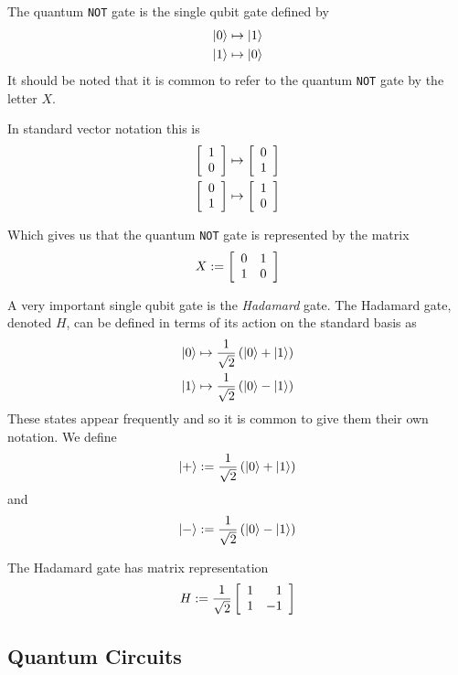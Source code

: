         \begin{example}
            The quantum \texttt{NOT} gate is the single qubit gate defined by
            \begin{align*}
                \ket{0} &\mapsto \ket{1} \\
                \ket{1} &\mapsto \ket{0}
            \end{align*}
            It should be noted that it is common to refer to the quantum \texttt{NOT} gate by the letter $X$.

            In standard vector notation this is
            \begin{align*}
                \left[\begin{array}{r}1\\0\end{array}\right] &\mapsto \left[\begin{array}{r}0\\1\end{array}\right] \\
                \left[\begin{array}{r}0\\1\end{array}\right] &\mapsto \left[\begin{array}{r}1\\0\end{array}\right] 
            \end{align*}

            Which gives us that the quantum \texttt{NOT} gate is represented by the matrix
            \[
                X := \left[\begin{array}{rr}0&1\\1&0\end{array}\right]
            \]
        \end{example}

        
        \begin{example}
            A very important single qubit gate is the \emph{Hadamard} gate. The Hadamard gate, denoted $H$, can be 
            defined in terms of its action on the standard basis as
            \begin{align*}
                \ket{0} &\mapsto \frac{1}{\sqrt{2}}\left(\ket{0} + \ket{1}\right) \\
                \ket{1} &\mapsto \frac{1}{\sqrt{2}}\left(\ket{0} - \ket{1}\right)
            \end{align*}
            These states appear frequently and so it is common to give them their own notation.
            We define
            \[
                \ket{+} := \frac{1}{\sqrt{2}}\left(\ket{0} + \ket{1}\right)
            \]
            and
            \[
                \ket{-} := \frac{1}{\sqrt{2}}\left(\ket{0} - \ket{1}\right)
            \]

            The Hadamard gate has matrix representation
            \[
                H := \frac{1}{\sqrt{2}} \left[\begin{array}{rr}1&1\\1&-1\end{array}\right]
            \]
        \end{example}

        
\subsection{Quantum Circuits}
        
